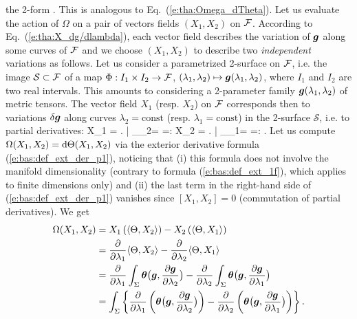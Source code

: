 the 2-form
\be
   \encadre{ \Omega := \Dd \Theta }.
\ee
This is analogous to Eq.~(\ref{e:tha:Omega_dTheta}).
Let us evaluate the action of $\Omega$ on a pair of vectors fields $(X_1, X_2)$
on $\mathcal{F}$. According to Eq.~(\ref{e:tha:X_dg/dlambda}),
each vector field describes the variation of $\bm{g}$ along some curves of $\mathcal{F}$
and we choose $(X_1, X_2)$ to describe two \emph{independent} variations as follows.
Let us consider a parametrized 2-surface on $\mathcal{F}$,
i.e. the image $\mathcal{S}\subset \mathcal{F}$ of a map $\Phi: I_1\times I_2 \to \mathcal{F}$, $(\lambda_1,\lambda_2) \mapsto \bm{g}(\lambda_1,\lambda_2)$,
where $I_1$ and $I_2$ are two real intervals. This amounts to considering a 2-parameter family
$\bm{g}(\lambda_1,\lambda_2)$
of metric tensors. The vector field $X_1$ (resp. $X_2$) on $\mathcal{F}$ corresponds then to variations
$\delta\bm{g}$
along curves $\lambda_2 = \mathrm{const}$ (resp. $\lambda_1 = \mathrm{const}$) in the 2-surface $\mathcal{S}$, i.e. to partial derivatives:
\be \label{e:tha:def_X1_X2}
    X_1 = \left.  \right| _{\lambda_2=}
      =:   \qand
    X_2 = \left.  \right| _{\lambda_1=}
      =:  .
\ee
Let us compute $\Omega(X_1,X_2) = \mathrm{d} \Theta (X_1,X_2)$ via the exterior derivative formula
(\ref{e:bas:def_ext_der_p1}), noticing that (i) this formula
does not involve the manifold dimensionality (contrary to formula (\ref{e:bas:def_ext_1f}),
which applies to finite dimensions only) and (ii) the last term in the right-hand
side of (\ref{e:bas:def_ext_der_p1}) vanishes since $[X_1,X_2] = 0$ (commutation of partial derivatives).
We get
\begin{align}
    \Omega(X_1,X_2) & = X_1\left( \langle \Theta, X_2 \rangle \right)
        -  X_2\left( \langle \Theta, X_1 \rangle \right) \nonumber \\
        & =  \frac{\partial }{\partial \lambda_1} \langle \Theta, X_2 \rangle -
            \frac{\partial }{\partial \lambda_2} \langle \Theta, X_1 \rangle \nonumber \\
        & = \frac{\partial }{\partial \lambda_1} \int_{\Sigma} \bm{\theta}\bm{\big(}\bm{g}, \frac{\partial \bm{g}}{\partial \lambda_2} \bm{\big)}
        - \frac{\partial }{\partial \lambda_2} \int_{\Sigma} \bm{\theta}\bm{\big(}\bm{g}, \frac{\partial \bm{g}}{\partial \lambda_1} \bm{\big)}   \nonumber \\
        & = \int_{\Sigma} \left\{ \frac{\partial }{\partial \lambda_1}
        \left( \bm{\theta} \bm{\big(}\bm{g}, \frac{\partial \bm{g}}{\partial \lambda_2} \bm{\big)} \right)
        - \frac{\partial }{\partial \lambda_2}\left( \bm{\theta}\bm{\big(}\bm{g}, \frac{\partial \bm{g}}{\partial \lambda_1} \bm{\big)} \right) \right\} .
        \nonumber
\end{align}
